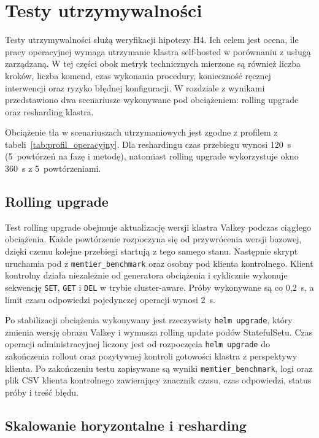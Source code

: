 \section{Testy utrzymywalności}\label{sec:testy_utrzymywalnosci}

Testy utrzymywalności służą weryfikacji hipotezy H4. Ich celem jest ocena, ile pracy operacyjnej wymaga utrzymanie klastra self-hosted w porównaniu z usługą zarządzaną. W tej części obok metryk technicznych mierzone są również liczba kroków, liczba komend, czas wykonania procedury, konieczność ręcznej interwencji oraz ryzyko błędnej konfiguracji. W rozdziale z wynikami przedstawiono dwa scenariusze wykonywane pod obciążeniem: rolling upgrade oraz resharding klastra.

Obciążenie tła w scenariuszach utrzymaniowych jest zgodne z profilem z tabeli~\ref{tab:profil_operacyjny}. Dla reshardingu czas przebiegu wynosi 120~s (5~powtórzeń na fazę i metodę), natomiast rolling upgrade wykorzystuje okno 360~s z 5~powtórzeniami.

\subsection{Rolling upgrade}\label{subsec:rolling_upgrade}

Test rolling upgrade obejmuje aktualizację wersji klastra Valkey podczas ciągłego obciążenia. Każde powtórzenie rozpoczyna się od przywrócenia wersji bazowej, dzięki czemu kolejne przebiegi startują z tego samego stanu. Następnie skrypt uruchamia pod z \texttt{memtier\_benchmark} oraz osobny pod klienta kontrolnego. Klient kontrolny działa niezależnie od generatora obciążenia i cyklicznie wykonuje sekwencję \texttt{SET}, \texttt{GET} i \texttt{DEL} w trybie cluster-aware. Próby wykonywane są co 0{,}2~s, a limit czasu odpowiedzi pojedynczej operacji wynosi 2~s.

Po stabilizacji obciążenia wykonywany jest rzeczywisty \texttt{helm upgrade}, który zmienia wersję obrazu Valkey i wymusza rolling update podów StatefulSetu. Czas operacji administracyjnej liczony jest od rozpoczęcia \texttt{helm upgrade} do zakończenia rollout oraz pozytywnej kontroli gotowości klastra z perspektywy klienta. Po zakończeniu testu zapisywane są wyniki \texttt{memtier\_benchmark}, logi oraz plik CSV klienta kontrolnego zawierający znacznik czasu, czas odpowiedzi, status próby i treść błędu.

\subsection{Skalowanie horyzontalne i resharding}\label{subsec:resharding}

